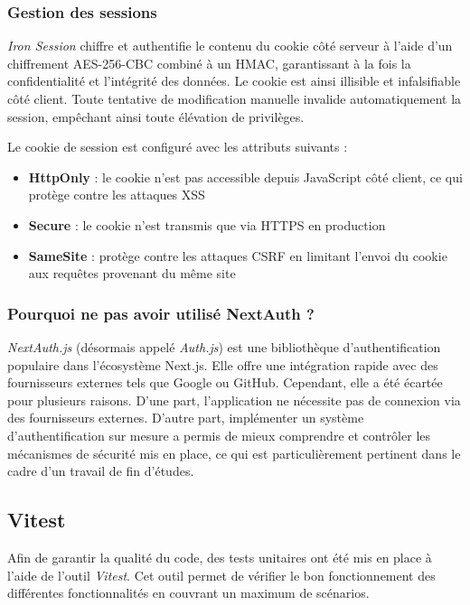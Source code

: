 \documentclass{article}
\begin{document}
\subsubsection{Gestion des sessions}

\textit{Iron Session} chiffre et authentifie le contenu du cookie 
côté serveur à l'aide d'un chiffrement AES-256-CBC combiné à un 
HMAC, garantissant à la fois la confidentialité et l'intégrité 
des données. Le cookie est ainsi illisible et infalsifiable côté 
client. Toute tentative de modification manuelle invalide 
automatiquement la session, empêchant ainsi toute élévation 
de privilèges.

Le cookie de session est configuré avec les attributs suivants :
\begin{itemize}
    \item \textbf{HttpOnly} : le cookie n'est pas accessible 
    depuis JavaScript côté client, ce qui protège contre 
    les attaques XSS
    \item \textbf{Secure} : le cookie n'est transmis que 
    via HTTPS en production
    \item \textbf{SameSite} : protège contre les attaques 
    CSRF en limitant l'envoi du cookie aux requêtes 
    provenant du même site
\end{itemize}

\subsubsection{Pourquoi ne pas avoir utilisé NextAuth ?}
\textit{NextAuth.js} (désormais appelé \textit{Auth.js}) est une 
bibliothèque d'authentification populaire dans l'écosystème Next.js. 
Elle offre une intégration rapide avec des fournisseurs externes 
tels que Google ou GitHub. Cependant, elle a été écartée pour 
plusieurs raisons. D'une part, l'application ne nécessite pas 
de connexion via des fournisseurs externes. D'autre part, 
implémenter un système d'authentification sur mesure a permis 
de mieux comprendre et contrôler les mécanismes de sécurité 
mis en place, ce qui est particulièrement pertinent dans le 
cadre d'un travail de fin d'études.   

\subsection{Vitest}

Afin de garantir la qualité du code, des tests unitaires ont été mis en place à l’aide de l’outil \textit{Vitest}. Cet outil permet de vérifier le bon fonctionnement des différentes fonctionnalités en couvrant un maximum de scénarios.
\end{document}
